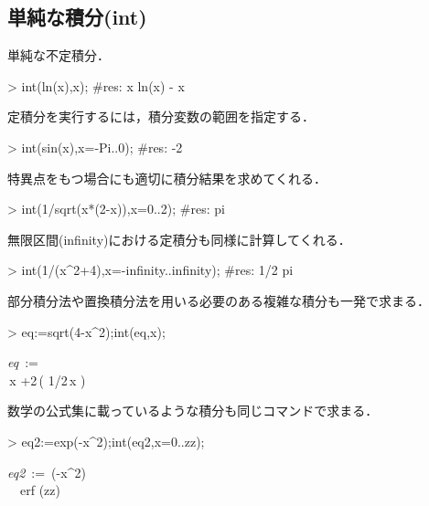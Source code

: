 \subsection{単純な積分(int)}
単純な不定積分．
\begin{MapleInput}
> int(ln(x),x);	#res: x ln(x) - x
\end{MapleInput}
定積分を実行するには，積分変数の範囲を指定する．
\begin{MapleInput}
> int(sin(x),x=-Pi..0);	#res: -2
\end{MapleInput}
特異点をもつ場合にも適切に積分結果を求めてくれる．
\begin{MapleInput}
> int(1/sqrt(x*(2-x)),x=0..2); #res: pi
\end{MapleInput}
無限区間(infinity)における定積分も同様に計算してくれる．
\begin{MapleInput}
> int(1/(x^2+4),x=-infinity..infinity); #res: 1/2 pi
\end{MapleInput}
部分積分法や置換積分法を用いる必要のある複雑な積分も一発で求まる．
\begin{MapleInput}
> eq:=sqrt(4-x^2);int(eq,x);
\end{MapleInput}
\begin{MapleOutputGather}
 {\it eq}\, := \,  \notag \\
 \,x +2\,\arcsin \left( 1/2\,x \right) \notag
\end{MapleOutputGather}
数学の公式集に載っているような積分も同じコマンドで求まる．
\begin{MapleInput}
> eq2:=exp(-x^2);int(eq2,x=0..zz);
\end{MapleInput}
\begin{MapleOutputGather}
{\it eq2}\, := \,\exp({-{x}^{2}}) \notag \\
\, \sqrt{\pi }\, \mbox{erf} \left(zz\right) \notag
\end{MapleOutputGather}